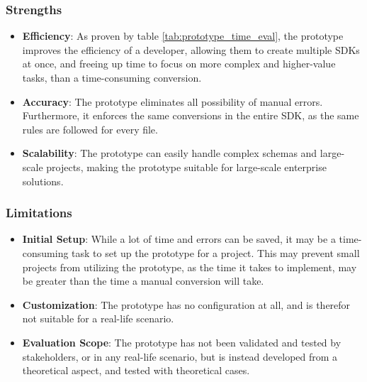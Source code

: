 \subsubsection*{Strengths}
\begin{itemize}
    \item \textbf{Efficiency}: As proven by table \ref{tab:prototype_time_eval}, the prototype improves the efficiency of a developer, allowing them to create multiple SDKs at once, and freeing up time to focus on more complex and higher-value tasks, than a time-consuming conversion.
    \item \textbf{Accuracy}: The prototype eliminates all possibility of manual errors. Furthermore, it enforces the same conversions in the entire SDK, as the same rules are followed for every file.
    \item \textbf{Scalability}: The prototype can easily handle complex schemas and large-scale projects, making the prototype suitable for large-scale enterprise solutions.
\end{itemize}

\subsubsection*{Limitations}
\begin{itemize}
    \item \textbf{Initial Setup}: While a lot of time and errors can be saved, it may be a time-consuming task to set up the prototype for a project. This may prevent small projects from utilizing the prototype, as the time it takes to implement, may be greater than the time a manual conversion will take.
    \item \textbf{Customization}: The prototype has no configuration at all, and is therefor not suitable for a real-life scenario.
    \item \textbf{Evaluation Scope}: The prototype has not been validated and tested by stakeholders, or in any real-life scenario, but is instead developed from a theoretical aspect, and tested with theoretical cases. 
\end{itemize}

